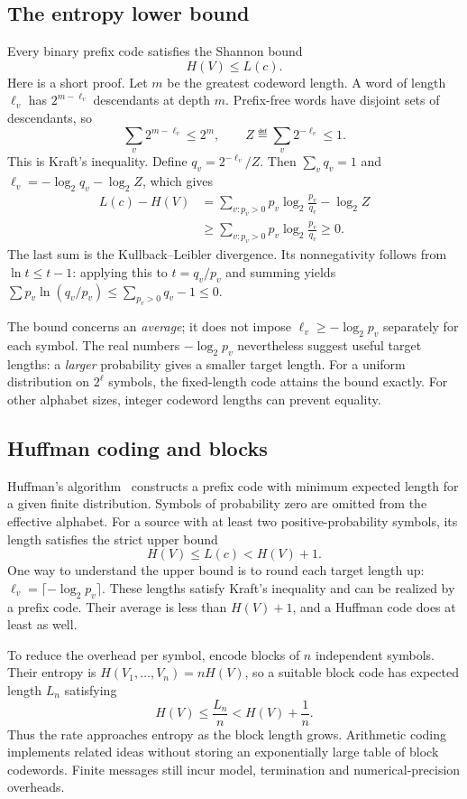 \subsection{The entropy lower bound}
Every binary prefix code satisfies the Shannon bound~\cite{Shannon1948}
\begin{equation}\label{eq-shannon-bound}
 H(V)\leq L(c).
\end{equation}
Here is a short proof. Let $m$ be the greatest codeword length. A word of length $\ell_v$ has $2^{m-\ell_v}$ descendants at depth $m$. Prefix-free words have disjoint sets of descendants, so
\[
 \sum_v2^{m-\ell_v}\leq2^m,
 \qquad Z\eqdef\sum_v2^{-\ell_v}\leq1.
\]
This is Kraft's inequality. Define $q_v=2^{-\ell_v}/Z$. Then $\sum_vq_v=1$ and $\ell_v=-\log_2q_v-\log_2Z$, which gives
\[
 \begin{aligned}
 L(c)-H(V)
 &=\sum_{v:p_v>0}p_v\log_2\frac{p_v}{q_v}-\log_2Z\\
 &\geq\sum_{v:p_v>0}p_v\log_2\frac{p_v}{q_v}\geq0.
 \end{aligned}
\]
The last sum is the Kullback--Leibler divergence. Its nonnegativity follows from $\ln t\leq t-1$: applying this to $t=q_v/p_v$ and summing yields $\sum p_v\ln(q_v/p_v)\leq\sum_{p_v>0}q_v-1\leq0$.

The bound concerns an \emph{average}; it does not impose $\ell_v\geq-\log_2p_v$ separately for each symbol. The real numbers $-\log_2p_v$ nevertheless suggest useful target lengths: a \emph{larger} probability gives a smaller target length. For a uniform distribution on $2^\ell$ symbols, the fixed-length code attains the bound exactly. For other alphabet sizes, integer codeword lengths can prevent equality.

\subsection{Huffman coding and blocks}
Huffman's algorithm~\cite{Huffman52} constructs a prefix code with minimum expected length for a given finite distribution. Symbols of probability zero are omitted from the effective alphabet. For a source with at least two positive-probability symbols, its length satisfies the strict upper bound
\[
 H(V)\leq L(c)<H(V)+1.
\]
One way to understand the upper bound is to round each target length up: $\ell_v=\lceil-\log_2p_v\rceil$. These lengths satisfy Kraft's inequality and can be realized by a prefix code. Their average is less than $H(V)+1$, and a Huffman code does at least as well.

To reduce the overhead per symbol, encode blocks of $n$ independent symbols. Their entropy is $H(V_1,\ldots,V_n)=nH(V)$, so a suitable block code has expected length $L_n$ satisfying
\[
 H(V)\leq\frac{L_n}{n}<H(V)+\frac1n.
\]
Thus the rate approaches entropy as the block length grows. Arithmetic coding~\cite{RissanenLangdon79} implements related ideas without storing an exponentially large table of block codewords. Finite messages still incur model, termination and numerical-precision overheads.

